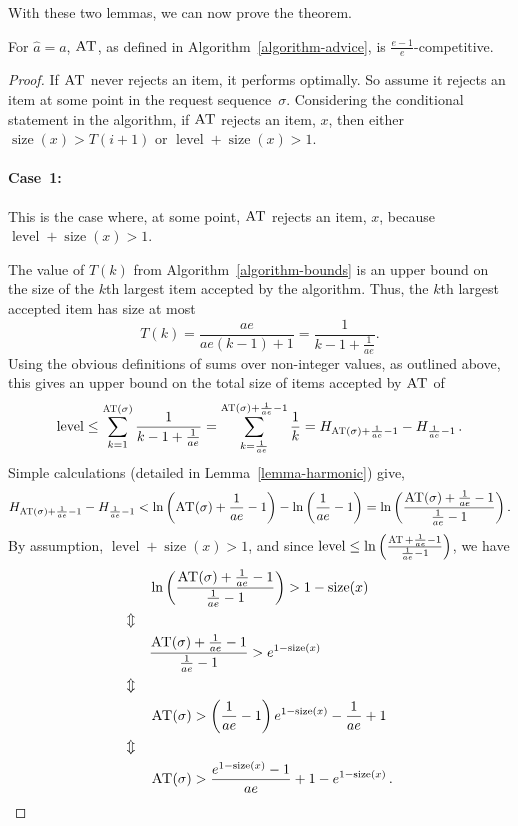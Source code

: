 \documentclass[a4paper,UKenglish,cleveref, autoref, thm-restate]{lipics-v2021}
\newcommand{\ADB}{\ensuremath{\operatorname{\textsc{AT}}}\xspace}
\newcommand{\TF}{T}
\newcommand{\SIZE}[1]{\ensuremath{\operatorname{\textrm{size}}(#1)}\xspace}
\newcommand{\LEVEL}{\ensuremath{\operatorname{\textrm{level}}}\xspace}
\newcommand{\guess}{\ensuremath{\hat{a}}\xspace}
\begin{document}
With these two lemmas, we can now prove the theorem.

\begin{theorem}
  \label{thm:adb}
  For $\guess=a$, \ADB, as defined in Algorithm~\ref{algorithm-advice},
  is $\frac{e-1}{e}$-competitive.
\end{theorem}
\begin{proof}
  If \ADB never rejects an item, it performs optimally. So assume it
  rejects an item at some point in the request sequence~$\sigma$.
  Considering the conditional statement in the algorithm, if \ADB
  rejects an item, $x$, then either $\SIZE{x} > \TF(i+1)$ or
  $\LEVEL + \SIZE{x} > 1$.

\paragraph*{Case~1:}
  This is the case where, at some point, \ADB rejects an
  item, $x$, because $\LEVEL + \SIZE{x} > 1$. 

  The value of $\TF(k)$ from Algorithm~\ref{algorithm-bounds} is an
  upper bound on the size of the $k$th largest item accepted by the
  algorithm.  Thus, the $k$th largest accepted item has size at most
\[
  \TF(k) = \frac{ae}{ae(k-1)+1} = \frac{1}{k - 1 + \frac{1}{ae}}.
\]
Using the obvious definitions of sums over non-integer values,
as outlined above,
this gives
an upper bound on the total size of items accepted by \ADB of
\[
\LEVEL \leq
\sum_{k=1}^{\ADB(\sigma)}\frac{1}{k-1+\frac{1}{ae}} =
\sum_{k=\frac{1}{ae}}^{\ADB(\sigma)+\frac{1}{ae}-1}\frac{1}{k} =
H_{\ADB(\sigma)+\frac{1}{ae}-1} - H_{\frac{1}{ae} - 1}\,.
\]
Simple calculations (detailed in Lemma~\ref{lemma-harmonic}) give,
\[
H_{\ADB(\sigma)+\frac{1}{ae}-1} - H_{\frac{1}{ae} - 1} < 
\ln\left(\ADB(\sigma)+\frac{1}{ae}-1\right) -
\ln\left(\frac{1}{ae} - 1\right)
=  \ln\left(\frac{\ADB(\sigma)+\frac{1}{ae}-1}{\frac{1}{ae}-1}\right).
\]
By assumption, $\LEVEL + \SIZE{x} > 1$, and since
$\LEVEL
\leq
\ln\left(\frac{\ADB+\frac{1}{ae}-1}{\frac{1}{ae} - 1}\right)$,
we have
\begin{alignat*}{2}
& \ln\left(\frac{\ADB(\sigma)+\frac{1}{ae}-1}{\frac{1}{ae} - 1}\right)
  >
  1 - \SIZE{x} \\
\Updownarrow~~~ \\
& \frac{\ADB(\sigma)+\frac{1}{ae}-1}{\frac{1}{ae} - 1} >
  e^{1 - \SIZE{x}} \\
\Updownarrow~~~ \\
& \ADB(\sigma) > 
  \left( \frac{1}{ae} - 1 \right) e^{1 - \SIZE{x}}-\frac{1}{ae}+1\\
\Updownarrow~~~ \\
& \ADB(\sigma) > 
 \frac{e^{1 - \SIZE{x}}-1}{ae} + 1 - e^{1 - \SIZE{x}}\,.
\end{alignat*}


\end{proof}
\end{document}
